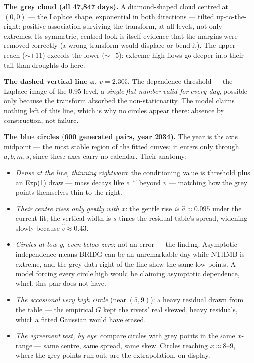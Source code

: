 \documentclass[11pt]{article}
\begin{document}
\textbf{The grey cloud (all 47{,}847 days).} A diamond-shaped cloud centred
at $(0,0)$ --- the Laplace shape, exponential in both directions --- tilted
up-to-the-right: positive association surviving the transform, at all
levels, not only extremes. Its symmetric, centred look is itself evidence
that the margins were removed correctly (a wrong transform would displace or
bend it). The upper reach ($\sim +11$) exceeds the lower ($\sim -5$):
extreme high flows go deeper into their tail than droughts do here.

\textbf{The dashed vertical line at $v = 2.303$.} The dependence threshold
--- the Laplace image of the 0.95 level, a \emph{single flat number valid
for every day}, possible only because the transform absorbed the
non-stationarity. The model claims nothing left of this line, which is why
no circles appear there: absence by construction, not failure.

\textbf{The blue circles (600 generated pairs, year 2034).} The year is the
axis midpoint --- the most stable region of the fitted curves; it enters
only through $a, b, m, s$, since these axes carry no calendar. Their
anatomy:
\begin{itemize}
\item \emph{Dense at the line, thinning rightward}: the conditioning value
is threshold plus an Exp(1) draw --- mass decays like $e^{-w}$ beyond $v$
--- matching how the grey points themselves thin to the right.
\item \emph{Their centre rises only gently with $x$}: the gentle rise
\emph{is} $\hat a \approx 0.095$ under the current fit; the vertical width
is $s$ times the residual table's spread, widening slowly because
$\hat b \approx 0.43$.
\item \emph{Circles at low $y$, even below zero}: not an error --- the
finding. Asymptotic independence means BRIDG can be an unremarkable day
while NTHMB is extreme, and the grey data right of the line show the same
low points. A model forcing every circle high would be claiming asymptotic
dependence, which this pair does not have.
\item \emph{The occasional very high circle} (near $(5, 9)$): a heavy
residual drawn from the table --- the empirical $G$ kept the rivers' real
skewed, heavy residuals, which a fitted Gaussian would have erased.
\item \emph{The agreement test, by eye}: compare circles with grey points
in the same $x$-range --- same centre, same spread, same skew. Circles
reaching $x \approx 8$--$9$, where the grey points run out, are the
extrapolation, on display.
\end{itemize}
\end{document}
